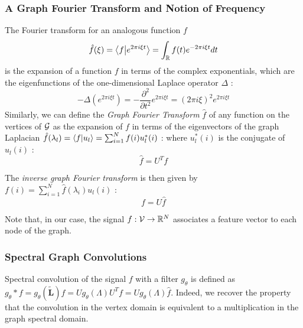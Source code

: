 \subsubsection{A Graph Fourier Transform and Notion of Frequency}
The Fourier transform for an analogous function $f$
$$
\hat{f}(\xi) = \left \langle f \middle| e^{2\pi i\xi t} \right \rangle = \int_{\mathbb{R}} f(t)e^{-2\pi i \xi t}dt
$$
is the expansion of a function $f$ in terms of the complex exponentials, which are the eigenfunctions of the one-dimensional Laplace operator $\Delta$ :
$$
-\Delta (e^{2\pi i \xi t}) = -\frac{\partial^2}{\partial t^2} e^{2\pi i \xi t} = (2\pi i\xi)^2 e^{2\pi i \xi t}
$$
Similarly, we can define the \textit{Graph Fourier Transform} $\hat{f}$ of any function on the vertices of $\mathcal{G}$ as the expansion of $f$ in terms of the eigenvectors of the graph Laplacian $\hat{f}(\lambda_l) = \left \langle f \middle| u_l \right \rangle = \sum_{i=1}^{N} f(i)u_l^*(i)$ : 
where $u_l^*(i)$ is the conjugate of $u_l(i)$ : 
\begin{equation}
    \hat{f} = U^Tf
\end{equation}

The \textit{inverse graph Fourier transform} is then given by $f(i) = \sum_{i=1}^{N} \hat{f}(\lambda_i)u_l(i)$ : 
\begin{equation}
    f = U\hat{f}
\end{equation}

Note that, in our case, the signal $f:\mathcal{V}\rightarrow\mathbb{R}^N$ associates a feature vector to each node of the graph.

\subsubsection{Spectral Graph Convolutions}

Spectral convolution of the signal $f$ with a filter $g_\theta$ is defined as $g_\theta * f = g_\theta(\widetilde{\mathbf{L}})f = Ug_\theta(\Lambda)U^Tf = U g_\theta(\Lambda)\hat{f}$. 
Indeed, we recover the property that the convolution in the vertex domain is equivalent to a multiplication in the graph spectral domain.

